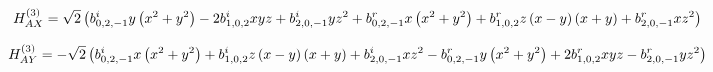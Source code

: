 \documentclass[fleqn]{article}
\begin{document}
\begin{dmath*}
H_{AX}^{(3)}=\sqrt{2} \left(b^{i}_{0,2,-1} y \left(x^{2} + y^{2}\right) - 2 b^{i}_{1,0,2} x y z + b^{i}_{2,0,-1} y z^{2} + b^{r}_{0,2,-1} x \left(x^{2} + y^{2}\right) + b^{r}_{1,0,2} z \left(x - y\right) \left(x + y\right) + b^{r}_{2,0,-1} x z^{2}\right)\\
\end{dmath*}

\begin{dmath*}
H_{AY}^{(3)}=-  \sqrt{2} \left( b^{i}_{0,2,-1} x \left(x^{2} + y^{2}\right) +  b^{i}_{1,0,2} z \left(x - y\right) \left(x + y\right) +  b^{i}_{2,0,-1} x z^{2} -  b^{r}_{0,2,-1} y \left(x^{2} + y^{2}\right) + 2 b^{r}_{1,0,2} x y z -  b^{r}_{2,0,-1} y z^{2}\right)\\
\end{dmath*}
\end{document}
